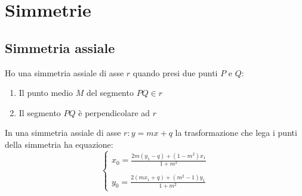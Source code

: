 
\chapter{Simmetrie}
\section{Simmetria assiale}
\begin{defn}\label{defn:Sassiale1}
Ho una simmetria assiale di asse $r$ quando presi due punti $P$ e $Q$:
\begin{enumerate}
	\item Il punto medio $M$ del segmento $PQ\in r$
	\item Il segmento $PQ$ è perpendicolare ad $r$
\end{enumerate} 
\end{defn}
\begin{thm}\label{thm:Sassiale1}
In una simmetria assiale di asse $r:y=mx+q$ la trasformazione che lega i punti della simmetria ha equazione:
\[\begin{cases}
x_0=\frac{2m(y_1-q)+(1-m^2)x_1}{1+m^2}\\
\\
y_0=\frac{2(mx_1+q)+(m^2-1)y_1}{1+m^2}
\end{cases}\]
\end{thm}
